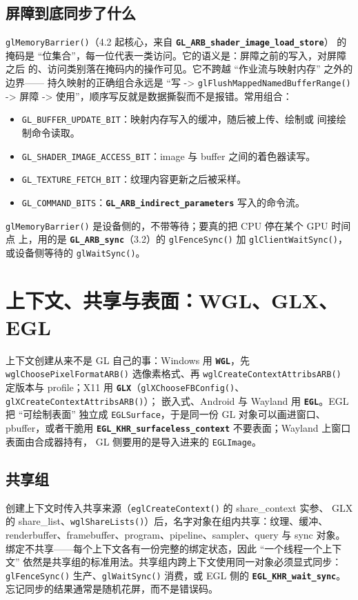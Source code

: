 \documentclass[12pt,a4paper,fontset=fandol]{ctexbook}
\newcommand{\Fn}[1]{\texttt{#1()}}
\newcommand{\Tp}[1]{\texttt{#1}}
\newcommand{\Bk}{\discretionary{}{}{}}
\newcommand{\Lib}[1]{\textbf{\texttt{#1}}}
\newcommand{\Lang}[1]{\textsf{#1}}
\newcommand{\DomCPU}{\Lang{CPU}}
\begin{document}
\subsection{屏障到底同步了什么}

\Fn{glMemoryBarrier}（4.2 起核心，来自 \Lib{GL\_ARB\_shader\_image\_load\_store}）
的掩码是 ``位集合''，每一位代表一类访问。它的语义是：屏障之前的写入，对屏障之后
的、访问类别落在掩码内的操作可见。它不跨越 ``作业流与映射内存'' 之外的边界------
持久映射的正确组合永远是 ``写 -> \Fn{glFlushMappedNamedBufferRange} -> 屏障 ->
使用''，顺序写反就是数据撕裂而不是报错。常用组合：

\begin{itemize}
\item \Tp{GL\_BUFFER\_UPDATE\_BIT}：映射内存写入的缓冲，随后被上传、绘制或
间接绘制命令读取。
\item \Tp{GL\_SHADER\_IMAGE\_ACCESS\_BIT}：image 与 buffer 之间的着色器读写。
\item \Tp{GL\_TEXTURE\_FETCH\_BIT}：纹理内容更新之后被采样。
\item \Tp{GL\_COMMAND\_BITS}：\Lib{GL\_ARB\_indirect\_parameters} 写入的命令流。
\end{itemize}

\Fn{glMemoryBarrier} 是设备侧的，不带等待；要真的把 \DomCPU{} 停在某个 GPU 时间点
上，用的是 \Lib{GL\_ARB\_sync}（3.2）的 \Fn{glFenceSync} 加
\Fn{glClientWaitSync}，或设备侧等待的 \Fn{glWaitSync}。

\section{上下文、共享与表面：WGL、GLX、EGL}

上下文创建从来不是 GL 自己的事：Windows 用 \Lib{WGL}，先 \Fn{wgl{\Bk}Choose{\Bk}Pixel{\Bk}FormatARB}
选像素格式、再 \Fn{wgl{\Bk}Create{\Bk}Context{\Bk}AttribsARB} 定版本与 profile；X11 用
\Lib{GLX}（\Fn{glXChooseFBConfig}、\Fn{glXCreate{\Bk}Context{\Bk}AttribsARB}）；
嵌入式、Android 与 Wayland 用 \Lib{EGL}。EGL 把 ``可绘制表面'' 独立成
\Tp{EGLSurface}，于是同一份 GL 对象可以画进窗口、pbuffer，或者干脆用
\Lib{EGL\_{\Bk}KHR\_{\Bk}surfaceless\_{\Bk}context} 不要表面；Wayland 上窗口表面由合成器持有，
GL 侧要用的是导入进来的 \Tp{EGLImage}。

\subsection{共享组}

创建上下文时传入共享来源（\Fn{eglCreateContext} 的 share\_context 实参、
GLX 的 share\_list、\Fn{wglShareLists}）后，名字对象在组内共享：纹理、缓冲、
renderbuffer、framebuffer、program、pipeline、sampler、query 与 sync 对象。
绑定不共享------每个上下文各有一份完整的绑定状态，因此 ``一个线程一个上下文''
依然是共享组的标准用法。共享组内跨上下文使用同一对象必须显式同步：
\Fn{glFenceSync} 生产、\Fn{glWaitSync} 消费，或 EGL 侧的
\Lib{EGL\_KHR\_wait\_sync}。忘记同步的结果通常是随机花屏，而不是错误码。
\end{document}
